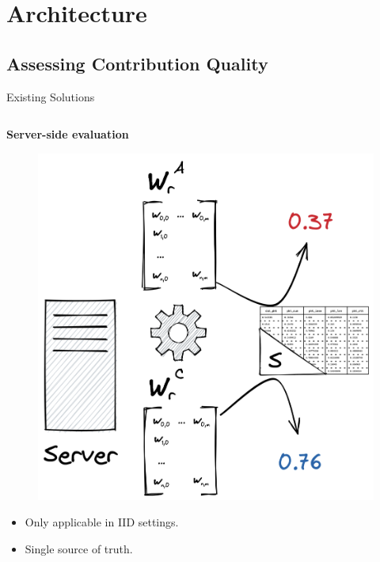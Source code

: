 \section{Architecture}

\subsection{Assessing Contribution Quality}

\begin{frame}{Existing Solutions}

  \begin{columns}[T]
    
    \begin{column}{.33\textwidth}
      \small\centering
      \textbf{Server-side evaluation}~\autocite{zhou_DifferentiallyPrivateFederated_2022}

      \begin{figure}
        \centering
        \includegraphics[height=.36\textheight]{figures/radar/server-side-eval}
      \end{figure}

      \begin{itemize}\smaller
        \item Only applicable in IID settings.
        \item Single source of truth.
      \end{itemize}
    \end{column}


\end{columns}
\end{frame}
